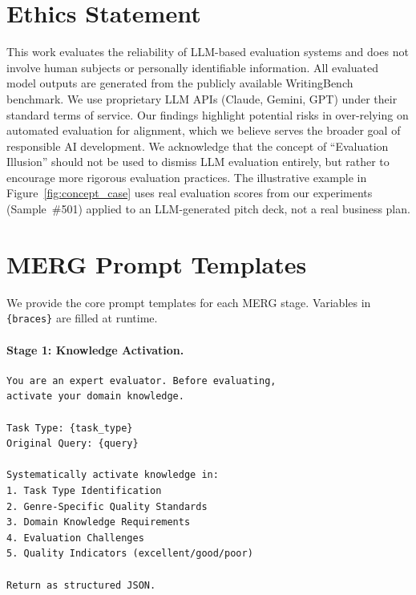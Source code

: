 \documentclass{article}
\begin{document}
\section*{Ethics Statement}

This work evaluates the reliability of LLM-based evaluation systems and does not involve human subjects or personally identifiable information. All evaluated model outputs are generated from the publicly available WritingBench benchmark. We use proprietary LLM APIs (Claude, Gemini, GPT) under their standard terms of service. Our findings highlight potential risks in over-relying on automated evaluation for alignment, which we believe serves the broader goal of responsible AI development. We acknowledge that the concept of ``Evaluation Illusion'' should not be used to dismiss LLM evaluation entirely, but rather to encourage more rigorous evaluation practices. The illustrative example in Figure~\ref{fig:concept_case} uses real evaluation scores from our experiments (Sample~\#501) applied to an LLM-generated pitch deck, not a real business plan.




\appendix

\section{MERG Prompt Templates}
\label{app:prompts}

We provide the core prompt templates for each MERG stage. Variables in \texttt{\{braces\}} are filled at runtime.

\paragraph{Stage 1: Knowledge Activation.}
\begin{small}
\begin{verbatim}
You are an expert evaluator. Before evaluating,
activate your domain knowledge.

Task Type: {task_type}
Original Query: {query}

Systematically activate knowledge in:
1. Task Type Identification
2. Genre-Specific Quality Standards
3. Domain Knowledge Requirements
4. Evaluation Challenges
5. Quality Indicators (excellent/good/poor)

Return as structured JSON.
\end{verbatim}
\end{small}
\end{document}
